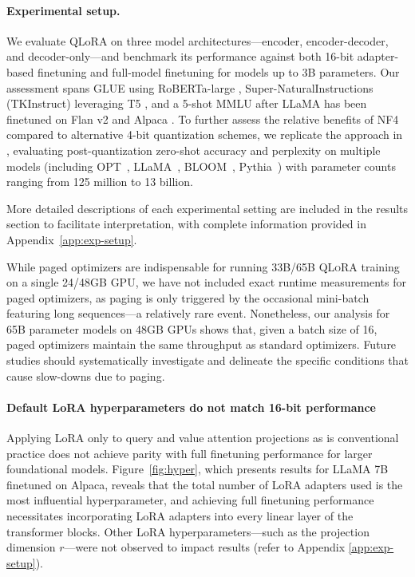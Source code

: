 \paragraph{Experimental setup.} We evaluate QLoRA on three model architectures—encoder, encoder-decoder, and decoder-only—and benchmark its performance against both 16-bit adapter-based finetuning and full-model finetuning for models up to 3B parameters. Our assessment spans GLUE \citep{wang2018glue} using RoBERTa-large \citep{liu2019roberta}, Super-NaturalInstructions (TKInstruct) \citep{wang2022super} leveraging T5 \citep{t5}, and a 5-shot MMLU \citep{hendrycksmeasuring} after LLaMA has been finetuned on Flan v2 \citep{longpre2023flan} and Alpaca \citep{alpaca}. To further assess the relative benefits of NF4 compared to alternative 4-bit quantization schemes, we replicate the approach in \citet{dettmers2022case}, evaluating post-quantization zero-shot accuracy and perplexity on multiple models (including OPT~\citep{zhang2022opt}, LLaMA~\citep{touvron2023llama}, BLOOM~\citep{scao2022bloom}, Pythia~\citep{biderman2023pythia}) with parameter counts ranging from 125 million to 13 billion.

More detailed descriptions of each experimental setting are included in the results section to facilitate interpretation, with complete information provided in Appendix~\ref{app:exp-setup}.

While paged optimizers are indispensable for running 33B/65B \textsc{QLoRA} training on a single 24/48GB GPU, we have not included exact runtime measurements for paged optimizers, as paging is only triggered by the occasional mini-batch featuring long sequences—a relatively rare event. Nonetheless, our analysis for 65B parameter models on 48GB GPUs shows that, given a batch size of 16, paged optimizers maintain the same throughput as standard optimizers. Future studies should systematically investigate and delineate the specific conditions that cause slow-downs due to paging.

\paragraph{Default LoRA hyperparameters do not match 16-bit performance} 

Applying LoRA only to query and value attention projections as is conventional practice \citep{hu2021lora} does not achieve parity with full finetuning performance for larger foundational models. Figure~\ref{fig:hyper}, which presents results for LLaMA 7B finetuned on Alpaca, reveals that the total number of LoRA adapters used is the most influential hyperparameter, and achieving full finetuning performance necessitates incorporating LoRA adapters into every linear layer of the transformer blocks. Other LoRA hyperparameters—such as the projection dimension $r$—were not observed to impact results (refer to Appendix \ref{app:exp-setup}).

